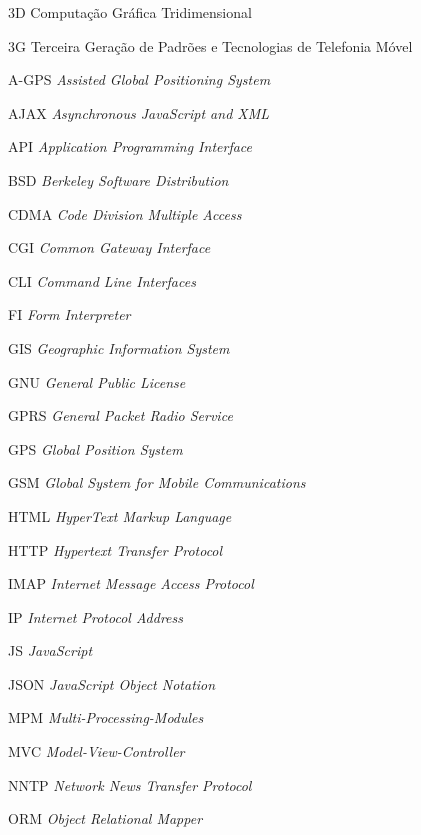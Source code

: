 
\begin{siglas}
    \item[3D] Computação Gráfica Tridimensional
    \item[3G] Terceira Geração de Padrões e Tecnologias de Telefonia Móvel
    \item[A-GPS] \textit{Assisted Global Positioning System}
    \item[AJAX] \textit{Asynchronous JavaScript and XML}
    \item[API] \textit{Application Programming Interface}
    \item[BSD] \textit{Berkeley Software Distribution}
    \item[CDMA] \textit{Code Division Multiple Access}
    \item[CGI] \textit{Common Gateway Interface}
    \item[CLI] \textit{Command Line Interfaces}
    \item[FI] \textit{Form Interpreter}
    \item[GIS] \textit{Geographic Information System}
    \item[GNU] \textit{General Public License}
    \item[GPRS] \textit{General Packet Radio Service}
    \item[GPS] \textit{Global Position System}
    \item[GSM] \textit{Global System for Mobile Communications}
    \item[HTML] \textit{HyperText Markup Language}
    \item[HTTP] \textit{Hypertext Transfer Protocol}
    \item[IMAP] \textit{Internet Message Access Protocol}
    \item[IP] \textit{Internet Protocol Address}
    \item[JS] \textit{JavaScript}
    \item[JSON] \textit{JavaScript Object Notation}
    \item[MPM] \textit{Multi-Processing-Modules}
    \item[MVC] \textit{Model-View-Controller}
    \item[NNTP] \textit{Network News Transfer Protocol}
    \item[ORM] \textit{Object Relational Mapper}

\end{siglas}
